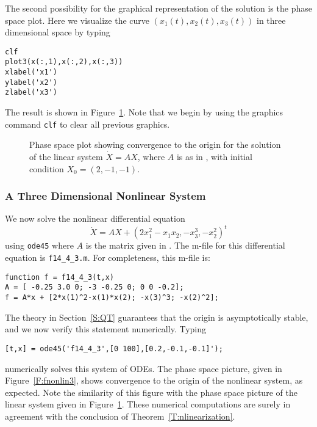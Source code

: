 The second possibility for the graphical representation of the solution
is the phase space plot.  Here we visualize the curve
$(x_1(t),x_2(t),x_3(t))$ in three dimensional space by typing
\begin{verbatim}
clf
plot3(x(:,1),x(:,2),x(:,3))
xlabel('x1')
ylabel('x2')
zlabel('x3')
\end{verbatim}
The result is shown in Figure~\ref{fig:flinear2}.  Note that we begin by 
using the \Matlab graphics command {\tt clf} to clear all previous graphics.
\begin{figure}[htb]
   \centerline{%
   }
   \caption{Phase space plot showing convergence to the origin for the 
	solution of the linear system $\dot X=AX$, where $A$ is as in 
	\protect{}, with initial condition $X_0=(2,-1,-1)$.}
   \label{fig:flinear2}
\end{figure}


\subsubsection*{A Three Dimensional Nonlinear System}

We now solve the nonlinear differential equation 
\begin{equation*}  \label{E:fnonlin}
\dot{X} = AX + (2x_1^2 - x_1x_2, -x_3^3, -x_2^2)^t
\end{equation*}
using {\tt ode45} where $A$ is the matrix given in .  The 
m-file for this differential equation is {\tt f14\_4\_3.m}. For completeness, 
this m-file is:
\begin{verbatim}
function f = f14_4_3(t,x)
A = [ -0.25 3.0 0; -3 -0.25 0; 0 0 -0.2];
f = A*x + [2*x(1)^2-x(1)*x(2); -x(3)^3; -x(2)^2];
\end{verbatim}
The theory in Section~\ref{S:QT} guarantees that the origin is
asymptotically stable, and we now verify this statement numerically.  Typing 
\begin{verbatim}
[t,x] = ode45('f14_4_3',[0 100],[0.2,-0.1,-0.1]');
\end{verbatim}
numerically solves this system of ODEs.  The phase space picture, given in
Figure~\ref{F:fnonlin3}, shows convergence to the origin of the nonlinear
system, as expected.  Note the similarity of this figure with the phase
space picture of the linear system given in Figure~\ref{fig:flinear2}. 
These numerical computations are surely in agreement with the conclusion
of Theorem~\ref{T:nlinearization}.

